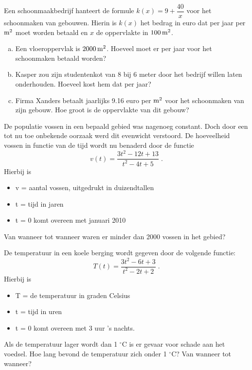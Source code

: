 \documentclass[12pt,twoside,a4paper]{article}
\begin{document}
\begin{oefening}
Een schoonmaakbedrijf hanteert de formule $k(x)=9+\dfrac{40}{x}$ voor het schoonmaken van gebouwen. Hierin is $k(x)$ het bedrag in euro dat per jaar per $\m^2$ moet worden betaald en $x$ de oppervlakte in $100 \m^2$.
\begin{enumerate}[(a)]
  \item Een vloeroppervlak is $2000 \m^2$. Hoeveel moet er per jaar voor het schoonmaken betaald worden?
  \item Kasper zou zijn studentenkot van 8 bij 6 meter door het bedrijf willen laten onderhouden. Hoeveel kost hem dat per jaar?
  \item Firma Xanders betaalt jaarlijks 9.16 euro per $\m^2$ voor het schoonmaken van zijn gebouw. Hoe groot is de oppervlakte van dit gebouw?
\end{enumerate}
\end{oefening}

\begin{oefening}
De populatie vossen in een bepaald gebied was nagenoeg constant. Doch door een tot nu toe onbekende oorzaak werd dit evenwicht verstoord. De hoeveelheid vossen in functie van de tijd wordt nu benaderd door de functie
$$v(t)=\dfrac{3t^2-12t+13}{t^2-4t+5}\;.$$
Hierbij is
\begin{itemize}
  \item v = aantal vossen, uitgedrukt in duizendtallen
  \item t = tijd in jaren
  \item t = 0 komt overeen met januari 2010
\end{itemize}
Van wanneer tot wanneer waren er minder dan 2000 vossen in het gebied?
\end{oefening}

\begin{oefening}
De temperatuur in een koele berging wordt gegeven door de volgende functie:
$$T(t)=\dfrac{3t^2-6t+3}{t^2-2t+2}\;.$$
Hierbij is
\begin{itemize}
  \item T = de temperatuur in graden Celsius
  \item t = tijd in uren
  \item t = 0 komt overeen met 3 uur 's nachts.
\end{itemize}
Als de temperatuur lager wordt dan 1 $^\circ$C is er gevaar voor schade aan het voedsel. Hoe lang bevond de temperatuur zich onder 1 $^\circ$C? Van wanneer tot wanneer?
\end{oefening}
\end{document}
